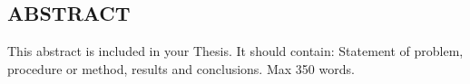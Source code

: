 \pagestyle{plain}
\begin{center}


\section*{ABSTRACT}


\end{center}

This abstract is included in your Thesis.  It should contain: Statement of problem, procedure or method, results and conclusions.  Max 350 words.

\cleardoublepage
